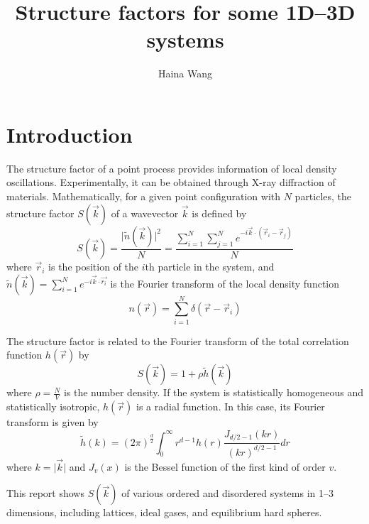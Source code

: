 \documentclass[journal=jacsat,manuscript=article]{achemso}
\author{Haina Wang}
\affiliation[Princeton University]{Department of Chemistry Torquato Lab, Princeton University, Princeton, NJ 08544, USA}
\title{Structure factors for some 1D--3D systems}
\begin{document}
	\maketitle
	\newpage
	\section{Introduction}
	The structure factor of a point process provides information of local density oscillations. Experimentally, it can be obtained through X-ray diffraction of materials. Mathematically, for a given point configuration with $N$ particles, the structure factor $S(\vec{k})$ of a wavevector $\vec{k}$ is defined by
	\begin{equation}
		S(\vec{k})=\frac{\vert\tilde{n}(\vec{k})\vert^2}{N}=\frac{\sum_{i=1}^{N}\sum_{j=1}^{N}e^{-i\vec{k}\cdot\left(\vec{r}_i-\vec{r}_j\right)}}{N}
	\end{equation}
	where $\vec{r}_i$ is the position of the $i$th particle in the system, and $\tilde{n}(\vec{k})=\sum_{i=1}^{N}e^{-i\vec{k}\cdot\vec{r_i}}$ is the Fourier transform of the local density function
	\begin{equation}
		n(\vec{r})=\sum_{i=1}^{N}\delta(\vec{r}-\vec{r}_i)
	\end{equation}
	
	The structure factor is related to the Fourier transform of the total correlation function $h(\vec{r})$ by
	\begin{equation}
		S(\vec{k})=1+\rho\tilde{h}(\vec{k})
	\end{equation}
	where $\rho=\frac{N}{V}$ is the number density. If the system is statistically homogeneous and statistically isotropic, $h(\vec{r})$ is a radial function. In this case, its Fourier transform is given by 
	\begin{equation}
		\tilde{h}(k)=(2\pi)^{\frac{d}{2}}\int_{0}^{\infty}r^{d-1}h(r)\frac{J_{d/2-1}(kr)}{(kr)^{d/2-1}}dr
	\end{equation}
	where $k=\vert\vec{k}\vert$ and $J_v(x)$ is the Bessel function of the first kind of order $v$.
	
	This report shows $S(\vec{k})$ of various ordered and disordered systems in 1--3 dimensions, including lattices, ideal gases, and equilibrium hard spheres.
	
	
	\newpage
\end{document}
